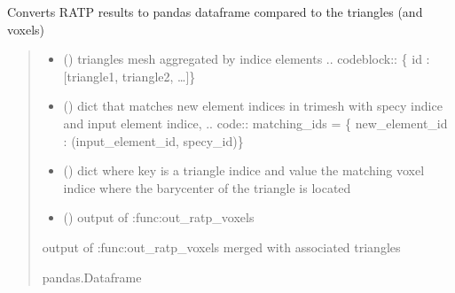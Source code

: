 \documentclass[letterpaper,10pt,english]{sphinxmanual}
\begin{document}
\begin{fulllineitems}
\label{\detokenize{reference:outputs.out_ratp_triangles}}
\pysigstartsignatures
{}
\pysigstopsignatures
\sphinxAtStartPar
Converts RATP results to pandas dataframe compared to the triangles (and voxels)
\begin{quote}\begin{description}
\begin{itemize}
\item {} 
\sphinxAtStartPar
{} () \textendash{} triangles mesh aggregated by indice elements
.. code\sphinxhyphen{}block:: \{ id : {[}triangle1, triangle2, …{]}\}

\item {} 
\sphinxAtStartPar
{} () \textendash{} dict that matches new element indices in trimesh with specy indice and
input element indice, 
.. code:: matching\_ids = \{ new\_element\_id : (input\_element\_id, specy\_id)\}

\item {} 
\sphinxAtStartPar
{} () \textendash{} dict where key is a triangle indice and value the matching voxel indice where the 
barycenter of the triangle is located

\item {} 
\sphinxAtStartPar
{} () \textendash{} output of :func:out\_ratp\_voxels

\end{itemize}

\sphinxAtStartPar
output of :func:out\_ratp\_voxels merged with associated triangles

\sphinxAtStartPar
pandas.Dataframe

\end{description}\end{quote}

\end{fulllineitems}
\end{document}
